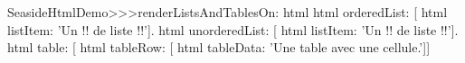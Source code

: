 \begin{code}{}
SeasideHtmlDemo>>>renderListsAndTablesOn: html 
	html orderedList: [
		html listItem: 'Un !! de liste !!'].
	html unorderedList: [
		html listItem: 'Un !! de liste !!'].
	html table: [
		html tableRow: [
			html tableData: 'Une table avec une cellule.']]
\end{code}
